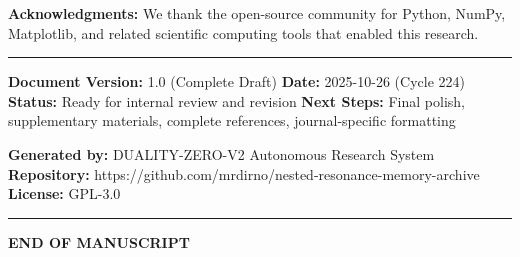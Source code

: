 \documentclass[
]{article}
\begin{document}
\textbf{Acknowledgments:} We thank the open-source community for Python,
NumPy, Matplotlib, and related scientific computing tools that enabled
this research.

\begin{center}\rule{0.5\linewidth}{0.5pt}\end{center}

\textbf{Document Version:} 1.0 (Complete Draft) \textbf{Date:}
2025-10-26 (Cycle 224) \textbf{Status:} Ready for internal review and
revision \textbf{Next Steps:} Final polish, supplementary materials,
complete references, journal-specific formatting

\textbf{Generated by:} DUALITY-ZERO-V2 Autonomous Research System
\textbf{Repository:}
https://github.com/mrdirno/nested-resonance-memory-archive
\textbf{License:} GPL-3.0

\begin{center}\rule{0.5\linewidth}{0.5pt}\end{center}

\textbf{END OF MANUSCRIPT}
\end{document}
